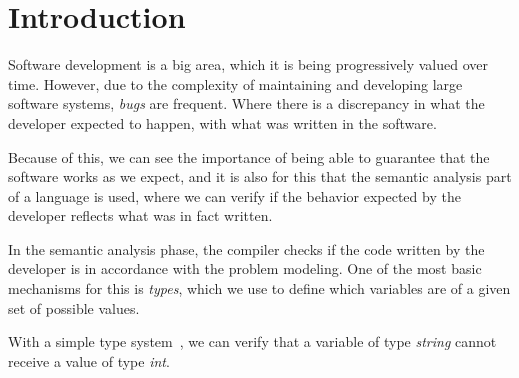 \chapter{Introduction}

Software development is a big area, which it is being progressively valued over time.
However, due to the complexity of maintaining and developing large software systems, \textit{bugs} are frequent.
Where there is a discrepancy in what the developer expected to happen, with what was written in the software.

Because of this, we can see the importance of being able to guarantee that the software works as we expect, and it is also for this that the semantic analysis part of a language is used, where we can verify if the behavior expected by the developer reflects what was in fact written.

In the semantic analysis phase, the compiler checks if the code written by the developer is in accordance with the problem modeling. One of the most basic mechanisms for this is \emph{types}, which we use to define which variables are of a given set of possible values.

With a simple type system~\cite{tapl}, we can verify that a variable of type \emph{string} cannot receive a value of type \emph{int}.

